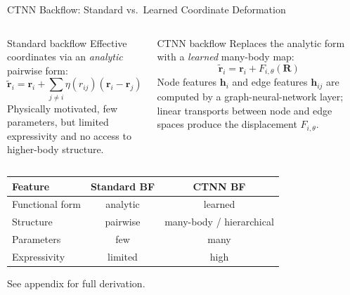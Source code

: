 \documentclass[aspectratio=169,10pt]{beamer}
\begin{document}
\begin{frame}{CTNN Backflow: Standard vs.\ Learned Coordinate Deformation}
  \begin{columns}[T]
      \begin{block}{Standard backflow}
        Effective coordinates via an \emph{analytic} pairwise form:
        \[
          \tilde{\mathbf{r}}_i = \mathbf{r}_i
            + \sum_{j\neq i}\eta(r_{ij})(\mathbf{r}_i-\mathbf{r}_j)
        \]
        Physically motivated, few parameters, but limited
        expressivity and no access to higher-body structure.
      \end{block}
      \begin{alertblock}{CTNN backflow}
        Replaces the analytic form with a \emph{learned} many-body map:
        \[
          \tilde{\mathbf{r}}_i = \mathbf{r}_i + F_{i,\theta}(\mathbf{R})
        \]
        Node features $\mathbf h_i$ and edge features $\mathbf h_{ij}$
        are computed by a graph-neural-network layer; linear transports
        between node and edge spaces produce the displacement
        $F_{i,\theta}$.
      \end{alertblock}
  \end{columns}
  \renewcommand{\arraystretch}{1.2}
  \begin{center}\small
  \begin{tabular}{lcc}
    \toprule
    Feature & Standard BF & CTNN BF \\
    \midrule
    Functional form   & analytic  & learned \\
    Structure         & pairwise  & many-body / hierarchical \\
    Parameters        & few       & many \\
    Expressivity      & limited   & high \\
    \bottomrule
  \end{tabular}
  \end{center}
  \vspace{0.1cm}
  {\footnotesize See appendix for full derivation.}
\end{frame}
\end{document}
